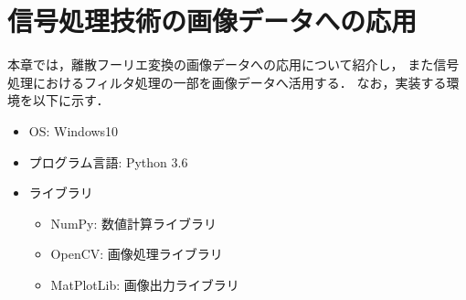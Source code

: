 \chapter{信号処理技術の画像データへの応用}

本章では，離散フーリエ変換の画像データへの応用について紹介し，
また信号処理におけるフィルタ処理の一部を画像データへ活用する．
なお，実装する環境を以下に示す．


\begin{itemize}
  \item OS: Windows10
  \item プログラム言語: Python 3.6
  \item ライブラリ
  \begin{itemize}
    \item NumPy: 数値計算ライブラリ
    \item OpenCV: 画像処理ライブラリ
    \item MatPlotLib: 画像出力ライブラリ
  \end{itemize}
\end{itemize}




